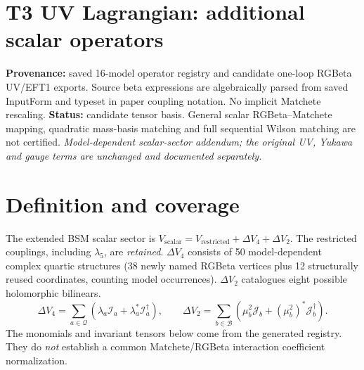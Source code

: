 \documentclass[9pt,a4paper]{article}
\begin{document}
\section*{T3 UV Lagrangian: additional scalar operators}
\textbf{Provenance:} saved 16-model operator registry and candidate one-loop RGBeta UV/EFT1 exports. Source beta expressions are algebraically parsed from saved InputForm and typeset in paper coupling notation. No implicit Matchete rescaling.
\textbf{Status:} candidate tensor basis. General scalar RGBeta--Matchete mapping, quadratic mass-basis matching and full sequential Wilson matching are not certified.
\textit{Model-dependent scalar-sector addendum; the original UV, Yukawa and gauge terms are unchanged and documented separately.}
\bigskip
\section*{Definition and coverage}
The extended BSM scalar sector is $V_{\mathrm{scalar}}=V_{\mathrm{restricted}}+\Delta V_4+\Delta V_2$. The restricted couplings, including $\lambda_5$, are \emph{retained}. $\Delta V_4$ consists of 50 model-dependent complex quartic structures (38 newly named RGBeta vertices plus 12 structurally reused coordinates, counting model occurrences). $\Delta V_2$ catalogues eight possible holomorphic bilinears.
\[\Delta V_4=\sum_{a\in\mathcal{Q}}\left(\lambda_a\mathcal{I}_a+\lambda_a^*\mathcal{I}_a^\dagger\right),\qquad \Delta V_2=\sum_{b\in\mathcal{B}}\left(\mu_b^2\mathcal{J}_b+(\mu_b^2)^*\mathcal{J}_b^\dagger\right).\]
The monomials and invariant tensors below come from the generated registry. They do \emph{not} establish a common Matchete/RGBeta interaction coefficient normalization.
\end{document}

